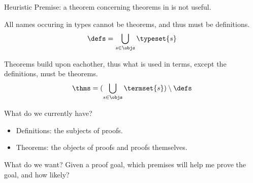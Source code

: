 \begin{frame}{Heuristic}
	Premise: a theorem concerning theorems in \coq is not useful.
	\bigskip
	\begin{definition}[$\defs$]
		All names occuring in types cannot be theorems, and thus must be definitions.
		\[ \defs = \bigcup_{s \in \objs} \typeset{s} \]
	\end{definition}
	\bigskip
	\begin{definition}[$\thms$]
		Theorems build upon eachother, thus what is used in terms, except the definitions, must be theorems.
		\[ \thms = (\bigcup_{s \in \objs} \termset{s}) \setminus \defs \]
	\end{definition}
\end{frame}

\begin{frame}{What do we currently have?}
	\begin{itemize}
		\item Definitions: the subjects of proofs.
		\item Theorems: the objects of proofs and proofs themselves.
	\end{itemize}
\end{frame}

\begin{frame}{What do we want?}
	Given a proof goal, which premises will help me prove the goal, and how likely?
\end{frame}

